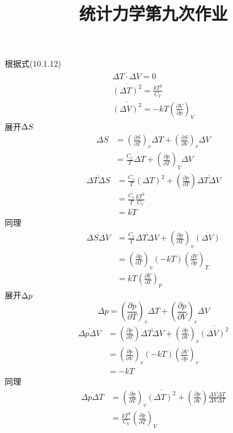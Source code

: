\documentclass[UTF8,9pt]{ctexart}
\title{统计力学第九次作业}
\begin{document}
 
\maketitle
{}
根据式(10.1.12)$$ 
\begin{array}{c}{\overline{\Delta T \cdot \Delta V}=0} \\ {\overline{(\Delta T)^{2}}=\frac{k T^{2}}{C_{V}}} \\ {\overline{(\Delta V)^{2}}=-k T\left(\frac{\partial V}{\partial p}\right)_{V}}\end{array}
 $$展开$\Delta S$
 $$ 
\begin{aligned} \Delta S &=\left(\frac{\partial S}{\partial T}\right)_{v} \Delta T+\left(\frac{\partial S}{\partial V}\right)_{r} \Delta V \\ &=\frac{C_{v}}{T} \Delta T+\left(\frac{\partial p}{\partial T}\right)_{V} \Delta V \end{aligned}
 $$$$ 
\begin{aligned} \overline{\Delta T \Delta S} &=\frac{C_{v}}{T}(\Delta T)^{2}+\left(\frac{\partial p}{\partial T}\right) \overline{\Delta T \Delta V} \\ &=\frac{C_{v}}{T} \frac{k T^{2}}{C_{v}} \\ &=k T \end{aligned}
 $$同理$$ 
\begin{aligned} \overline{\Delta S \Delta V} &=\frac{C_{v}}{T} \overline{\Delta T \Delta V}+\left(\frac{\partial p}{\partial T}\right)_{v} \overline{(\Delta V)} \\ &=\left(\frac{\partial p}{\partial T}\right)_{v}(-k T)\left(\frac{\partial V}{\partial p}\right)_{T} \\ &=k T\left(\frac{\partial V}{\partial T}\right)_{p} \end{aligned}
 $$展开$\Delta p$
 $$ 
\Delta p=\left(\frac{\partial p}{\partial T}\right)_{v} \Delta T+\left(\frac{\partial p}{\partial V}\right)_{r} \Delta V
 $$$$ 
\begin{aligned} \overline{\Delta p \Delta V} &=\left(\frac{\partial p}{\partial T}\right) \overline{\Delta T \Delta V}+\left(\frac{\partial p}{\partial V}\right)_{r} \overline{(\Delta V)^{2}} \\ &=\left(\frac{\partial p}{\partial V}\right)_{r}(-k T)\left(\frac{\partial V}{\partial p}\right)_{r} \\ &=-k T \end{aligned}
 $$同理$$ 
\begin{aligned} \overline{\Delta p \Delta T} &=\left(\frac{\partial p}{\partial T}\right)_{v} \overline{(\Delta T)^{2}}+\left(\frac{\partial p}{\partial V}\right) \frac{\overline{\Delta V \Delta T}}{\Delta V \Delta T} \\ &=\frac{k T^{2}}{C_{V}}\left(\frac{\partial p}{\partial T}\right)_{V} \end{aligned}
 $$
\end{document}

